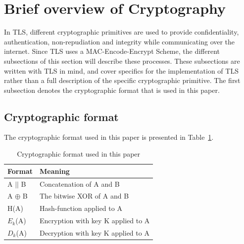 \documentclass[10pt,conference,a4paper]{IEEEtran}
\begin{document}
\section{Brief overview of Cryptography}
\label{sec:crypto}
In TLS, different cryptographic primitives are used to provide confidentiality, authentication, non-repudiation and integrity while communicating over the internet. Since TLS uses a MAC-Encode-Encrypt Scheme, the different subsections of this section will describe these processes. These subsections are written with TLS in mind, and cover specifics for the implementation of TLS rather than a full description of the specific cryptographic primitive. The first subsection denotes the cryptographic format that is used in this paper.

\subsection{Cryptographic format}
\label{sec:crypto:format}
The cryptographic format used in this paper is presented in Table~\ref{sec:crypto:format:table}.
\begin{table}[h]
    \begin{tabular}{l|l}
    Format & Meaning \\ \hline
    A $||$ B    & Concatenation of A and B  \\
    A $\oplus$ B  & The bitwise XOR of A and B     \\
    H(A)    & Hash-function applied to A    \\
    $E_k$(A)    & Encryption with key K applied to A    \\
    $D_k$(A)    & Decryption with key K applied to A    \\
    \end{tabular}
    \caption{Cryptographic format used in this paper}
    \label{sec:crypto:format:table}
\end{table}
\end{document}
